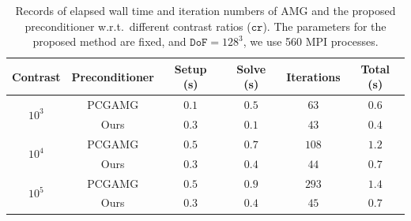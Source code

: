 \documentclass[preprint,12pt]{elsarticle}
\begin{document}
  \begin{table}
    [!ht] \footnotesize
    \caption{Records of elapsed wall time and iteration numbers of AMG and the
    proposed preconditioner w.r.t.\ different contrast ratios ($\mathtt{cr}$).
    The parameters for the proposed method are fixed, and $\mathtt{DoF}=128^{3}$,
    we use 560 MPI processes.}
    \label{tab:comparison_contrast_128}
    \begin{center}
      \makegapedcells
      \begin{tabular}{c c c c c c}
        \toprule Contrast                  & Preconditioner & Setup (s) & Solve (s) & Iterations & Total (s) \\
        \midrule \multirow{2}{*}{$10^{3}$} & PCGAMG         & $0.1$     & $0.5$     & $63$       & $0.6$     \\
                                           & Ours           & $0.3$     & $0.1$     & $43$       & $0.4$     \\
        \midrule \multirow{2}{*}{$10^{4}$} & PCGAMG         & $0.5$     & $0.7$     & $108$      & $1.2$     \\
                                           & Ours           & $0.3$     & $0.4$     & $44$       & $0.7$     \\
        \midrule \multirow{2}{*}{$10^{5}$} & PCGAMG         & $0.5$     & $0.9$     & $293$      & $1.4$     \\
                                           & Ours           & $0.3$     & $0.4$     & $45$       & $0.7$     \\
        \bottomrule
      \end{tabular}
    \end{center}
  \end{table}
\end{document}
